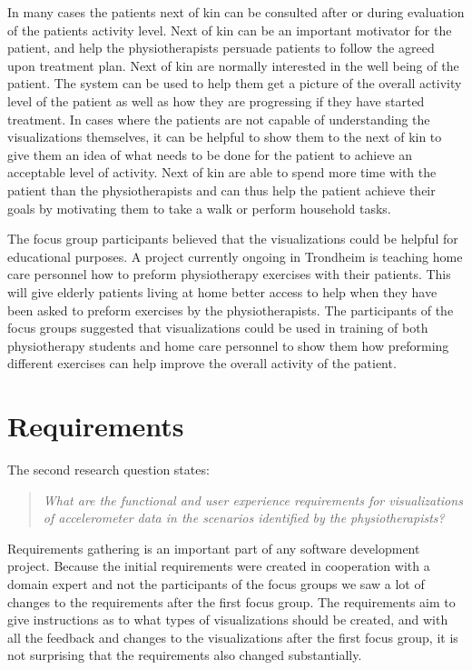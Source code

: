 In many cases the patients next of kin can be consulted after or during evaluation of the patients activity level. Next of kin can be an important motivator for the patient, and help the physiotherapists persuade patients to follow the agreed upon treatment plan. Next of kin are normally interested in the well being of the patient. The system can be used to help them get a picture of the overall activity level of the patient as well as how they are progressing if they have started treatment. In cases where the patients are not capable of understanding the visualizations themselves, it can be helpful to show them to the next of kin to give them an idea of what needs to be done for the patient to achieve an acceptable level of activity. Next of kin are able to spend more time with the patient than the physiotherapists and can thus help the patient achieve their goals by motivating them to take a walk or perform household tasks.

The focus group participants believed that the visualizations could be helpful for educational purposes. A project currently ongoing in Trondheim is teaching home care personnel how to preform physiotherapy exercises with their patients. This will give elderly patients living at home better access to help when they have been asked to preform exercises by the physiotherapists. The participants of the focus groups suggested that visualizations could be used in training of both physiotherapy students and home care personnel to show them how preforming different exercises can help improve the overall activity of the patient.

\section{Requirements}
The second research question states:
\begin{quote}
\textit{What are the functional and user experience requirements for visualizations of accelerometer data in the scenarios identified by the physiotherapists?}
\end{quote}

Requirements gathering is an important part of any software development project. Because the initial requirements were created in cooperation with a domain expert and not the participants of the focus groups we saw a lot of changes to the requirements after the first focus group. The requirements aim to give instructions as to what types of visualizations should be created, and with all the feedback and changes to the visualizations after the first focus group, it is not surprising that the requirements also changed substantially.


